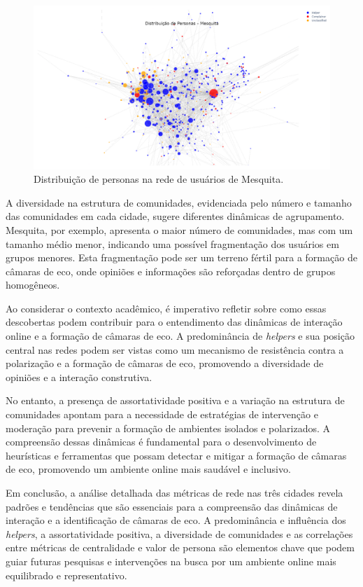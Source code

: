 \begin{figure}[h]
    \centering
    \includegraphics[width=1\textwidth]{images/network_personas_mesquita.png}
    \caption{Distribuição de personas na rede de usuários de Mesquita.}
    \label{fig:network_personas_mesquita}
\end{figure}

A diversidade na estrutura de comunidades, evidenciada pelo número e tamanho das comunidades em cada cidade, sugere diferentes dinâmicas de agrupamento. Mesquita, por exemplo, apresenta o maior número de comunidades, mas com um tamanho médio menor, indicando uma possível fragmentação dos usuários em grupos menores. Esta fragmentação pode ser um terreno fértil para a formação de câmaras de eco, onde opiniões e informações são reforçadas dentro de grupos homogêneos.

Ao considerar o contexto acadêmico, é imperativo refletir sobre como essas descobertas podem contribuir para o entendimento das dinâmicas de interação online e a formação de câmaras de eco. A predominância de \textit{helpers} e sua posição central nas redes podem ser vistas como um mecanismo de resistência contra a polarização e a formação de câmaras de eco, promovendo a diversidade de opiniões e a interação construtiva.

No entanto, a presença de assortatividade positiva e a variação na estrutura de comunidades apontam para a necessidade de estratégias de intervenção e moderação para prevenir a formação de ambientes isolados e polarizados. A compreensão dessas dinâmicas é fundamental para o desenvolvimento de heurísticas e ferramentas que possam detectar e mitigar a formação de câmaras de eco, promovendo um ambiente online mais saudável e inclusivo.

Em conclusão, a análise detalhada das métricas de rede nas três cidades revela padrões e tendências que são essenciais para a compreensão das dinâmicas de interação e a identificação de câmaras de eco. A predominância e influência dos \textit{helpers}, a assortatividade positiva, a diversidade de comunidades e as correlações entre métricas de centralidade e valor de persona são elementos chave que podem guiar futuras pesquisas e intervenções na busca por um ambiente online mais equilibrado e representativo.

